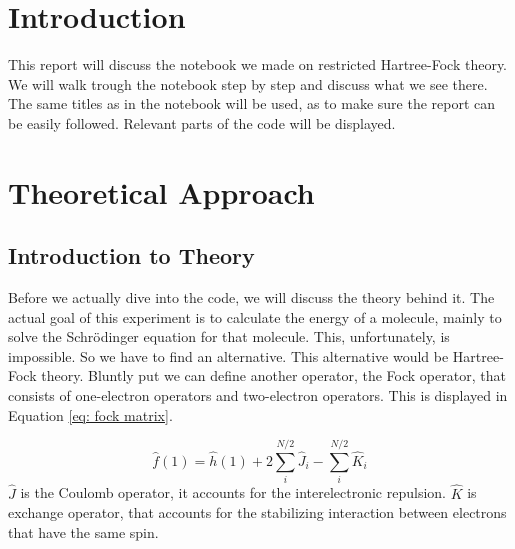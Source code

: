 \section{Introduction}
\label{sec:intro}
This report will discuss the notebook we made on restricted Hartree-Fock theory.
We will walk trough the notebook step by step and discuss what we see there. 
The same titles as in the notebook will be used, as to make sure the report can be 
easily followed. Relevant parts of the code will be displayed.

 \section{Theoretical Approach}
 \label{sec:theory}
 \subsection{Introduction to Theory}
 \label{subsec:intro}
 Before we actually dive into the code, we will discuss the theory behind it.
 The actual goal of this experiment is to calculate the energy of a molecule,
 mainly to solve the Schrödinger equation for that molecule. This, unfortunately,
 is impossible. So we have to find an alternative. This alternative would be
Hartree-Fock theory. Bluntly put we can define another operator, the Fock operator,
that consists of one-electron operators and two-electron operators. This is 
displayed in Equation \ref{eq: fock matrix}. 

\begin{equation}\label{eq: fock matrix}
    \hat{f}(1) = \hat{h}(1) + 2\sum_i^{N/2}\hat{J}_i - \sum_i^{N/2}\hat{K}_i
\end{equation}
 $\hat{J}$ is the Coulomb operator, it accounts for the interelectronic repulsion. $\hat{K}$ is 
 exchange operator, that accounts for the stabilizing interaction between 
 electrons that have the same spin. 
